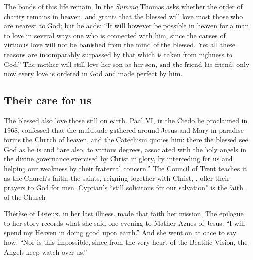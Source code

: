 The bonds of this life remain. In the \emph{Summa} Thomas asks whether the order of charity remains in heaven, and grants that the blessed will love most those who are nearest to God; but he adds: ``It will however be possible in heaven for a man to love in several ways one who is connected with him, since the causes of virtuous love will not be banished from the mind of the blessed. Yet all these reasons are incomparably surpassed by that which is taken from nighness to God.'' The mother will still love her son as her son, and the friend his friend; only now every love is ordered in God and made perfect by him.

\subsection{Their care for us}

The blessed also love those still on earth. Paul VI, in the Credo he proclaimed in 1968, confessed that the multitude gathered around Jesus and Mary in paradise forms the Church of heaven, and the Catechism quotes him: there the blessed see God as he is and ``are also, to various degrees, associated with the holy angels in the divine governance exercised by Christ in glory, by interceding for us and helping our weakness by their fraternal concern.'' The Council of Trent teaches it as the Church's faith: the saints, reigning together with Christ, , offer their prayers to God for men. Cyprian's ``still solicitous for our salvation'' is the faith of the Church.

Thérèse of Lisieux, in her last illness, made that faith her mission. The epilogue to her story records what she said one evening to Mother Agnes of Jesus: ``I will spend my Heaven in doing good upon earth.'' And she went on at once to say how: ``Nor is this impossible, since from the very heart of the Beatific Vision, the Angels keep watch over us.''

